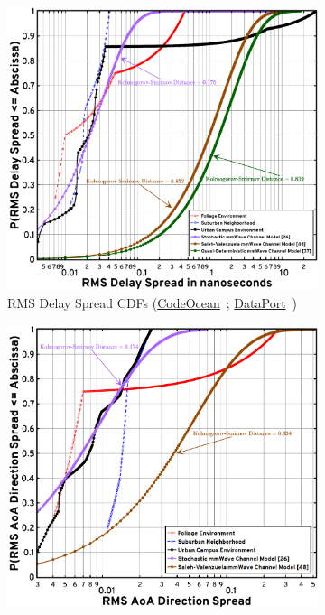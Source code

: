 \documentclass[10pt, twocolumn]{IEEEtran}
\begin{document}
{\begin{figure} [t]
    \centering
    \begin{subfigure}{0.494\linewidth}
        \centering
        \includegraphics[width=0.97\linewidth]{figs/rms_delay_spread.png}
        \caption{RMS Delay Spread CDFs (\href{https://codeocean.com/capsule/9545863/tree}{CodeOcean}~\cite{CodeOcean}; \href{http://ieee-dataport.org/12580}{DataPort}~\cite{DataPort})}
        \label{F11a}
    \end{subfigure}
    \begin{subfigure}{0.496\linewidth}
        \centering
        \includegraphics[width=0.97\linewidth]{figs/rms_aoa_direction_spread.png}

\end{subfigure}
\end{figure}}
\end{document}
